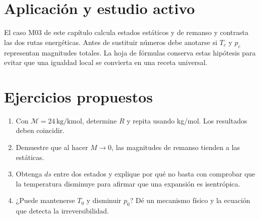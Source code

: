 \section{Aplicación y estudio activo}
El caso M03 de este capítulo calcula estados estáticos y de remanso y contrasta las dos rutas energéticas. Antes de sustituir números debe anotarse si $T_c$ y $p_c$ representan magnitudes totales. La hoja de fórmulas conserva estas hipótesis para evitar que una igualdad local se convierta en una receta universal.
\section{Ejercicios propuestos}
\begin{enumerate}
\item Con $\mathcal M=24\,\mathrm{kg/kmol}$, determine $R$ y repita usando kg/mol. Los resultados deben coincidir.
\item Demuestre que al hacer $M\to0$, las magnitudes de remanso tienden a las estáticas.
\item Obtenga $ds$ entre dos estados y explique por qué no basta con comprobar que la temperatura disminuye para afirmar que una expansión es isentrópica.
\item ¿Puede mantenerse $T_0$ y disminuir $p_0$? Dé un mecanismo físico y la ecuación que detecta la irreversibilidad.
\end{enumerate}
